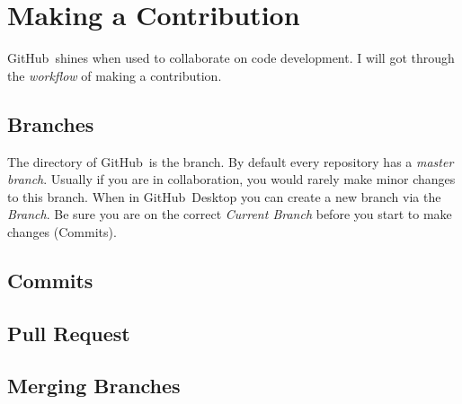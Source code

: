 \documentclass{article}
\newcommand{\gh}{GitHub~}
\begin{document}
\section{Making a Contribution}

\gh shines when used to collaborate on code development. I will got through the \textit{workflow} of making a contribution.

\subsection{Branches}

The directory of \gh is the branch. By default every repository has a \textit{master branch}. Usually if you are in collaboration, you would rarely make minor changes to this branch. When in \gh Desktop you can create a new branch via the \textit{Branch}. Be sure you are on the correct \textit{Current Branch} before you start to make changes (Commits).

\subsection{Commits}

\subsection{Pull Request}

\subsection{Merging Branches}
\end{document}
